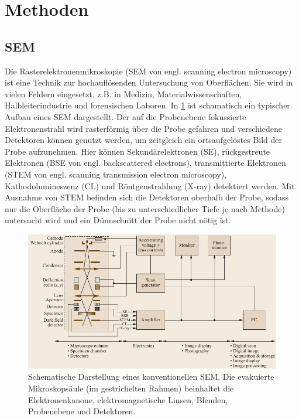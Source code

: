 \section{Methoden}


\subsection{SEM}
\label{sec:SEM}

Die Rasterelektronenmikroskopie (SEM von engl. scanning electron microscopy) ist eine Technik zur hochauflösenden Untersuchung von Oberflächen.
Sie wird in vielen Feldern eingesetzt, z.B. in Medizin, Materialwissenschaften, Halbleiterindustrie und forensischen Laboren.
In \cref{fig:sem_schematic} ist schamatisch ein typischer Aufbau eines SEM dargestellt.
Der auf die Probenebene fokussierte Elektronenstrahl wird rasterförmig über die Probe gefahren und verschiedene Detektoren können genutzt werden, um zeitgleich ein ortsaufgelöstes Bild der Probe aufzunehmen.
Hier können Sekundärelektronen (SE), rückgestreute Elektronen (BSE von engl. backscattered electrons), transmittierte Elektronen (STEM von engl. scanning transmission electron microscopy), Kathodolumineszenz (CL) und Röntgenstrahlung (X-ray) detektiert werden.
Mit Ausnahme von STEM befinden sich die Detektoren oberhalb der Probe, sodass nur die Oberfläche der Probe (bis zu unterschiedlicher Tiefe je nach Methode) untersucht wird und ein Dünnschnitt der Probe nicht nötig ist.

\begin{figure}[!ht]
    \centering
    \includegraphics[width=\textwidth]{img/sem_schematic}
    \caption{
    Schematische Darstellung eines konventionellen SEM.
    Die evakuierte Mikroskopsäule (im gestrichelten Rahmen) beinhaltet die Elektronenkanone, elektromagnetische Linsen, Blenden, Probenebene und Detektoren. \cite{springer-handbook}
    }
    \label{fig:sem_schematic}
\end{figure}

